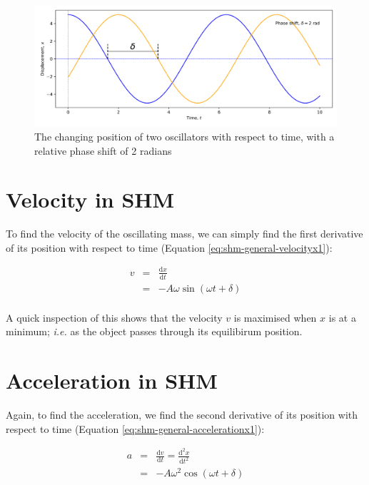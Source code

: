\documentclass[
]{book}
\begin{document}
\begin{figure}

{\centering \includegraphics[width=0.7\linewidth]{visualisations/ch1-shmpos} 

}

\caption{The changing position of two oscillators with respect to time, with a relative phase shift of 2 radians }\label{fig:ch1-shmpos-1}
\end{figure}

\hypertarget{sec:shm-velocity}{%
\section{Velocity in SHM}\label{sec:shm-velocity}}

To find the velocity of the oscillating mass, we can simply find the first derivative of its position with respect to time (Equation \eqref{eq:shm-general-velocityx1}):

\begin{equation}
\begin{array}{rcl}
v & = & \frac{\textrm{d}x}{\textrm{d}t}\\
&=& -A \omega \sin (\omega t + \delta)\\
\end{array}
\label{eq:shm-general-velocityx1}
\end{equation}

A quick inspection of this shows that the velocity \(v\) is maximised when \(x\) is at a minimum; \emph{i.e.} as the object passes through its equilibirum position.

\hypertarget{sec:shm-acceleration}{%
\section{Acceleration in SHM}\label{sec:shm-acceleration}}

Again, to find the acceleration, we find the second derivative of its position with respect to time (Equation \eqref{eq:shm-general-accelerationx1}):

\begin{equation}
\begin{array}{rcl}
a & = & \frac{\textrm{d}v}{\textrm{d}t} = \frac{\textrm{d}^2 x}{\textrm{d}t^2}\\
&=& -A \omega^2 \cos (\omega t + \delta)\\
\end{array}
\label{eq:shm-general-accelerationx1}
\end{equation}
\end{document}
